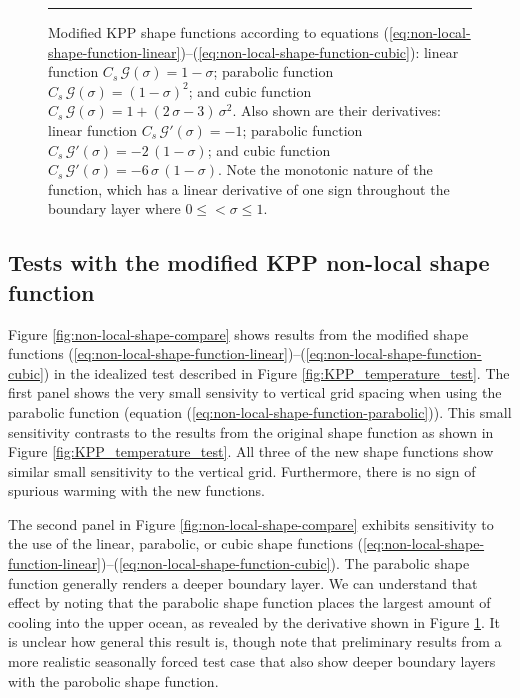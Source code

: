 \begin{figure}[h!t]
\begin{center}
\caption[Modified KPP shape function]{\sf Modified KPP shape functions
  according to equations
  (\ref{eq:non-local-shape-function-linear})--(\ref{eq:non-local-shape-function-cubic}):
  linear function $C_{s} \, \mathcal{G}(\sigma) = 1 - \sigma$;
  parabolic function $C_{s} \, \mathcal{G}(\sigma) = (1 -
  \sigma)^{2}$; and cubic function $C_{s} \, \mathcal{G}(\sigma) = 1 +
  (2 \, \sigma - 3) \, \sigma^{2}$.  Also shown are their derivatives:
  linear function $C_{s} \, \mathcal{G}'(\sigma) = -1$; parabolic
  function $C_{s} \, \mathcal{G}'(\sigma) = -2 \, (1 - \sigma)$; and
  cubic function $C_{s} \, \mathcal{G}'(\sigma) = -6 \, \sigma \, (1-
  \sigma)$.  Note the monotonic nature of the function, which has a
  linear derivative of one sign throughout the boundary layer where $0
  \le< \sigma \le 1$.}
\label{fig:KPPmod-shape-function}
\end{center}
\rule{\textwidth}{0.005in}
\end{figure}


\subsection{Tests with the modified KPP non-local shape function}
\label{subsection:tests-of-kpp-modified-non-local}

Figure \ref{fig:non-local-shape-compare} shows results from the
modified shape functions
(\ref{eq:non-local-shape-function-linear})--(\ref{eq:non-local-shape-function-cubic})
in the idealized test described in Figure
\ref{fig:KPP_temperature_test}.  The first panel shows the very small
sensivity to vertical grid spacing when using the parabolic function
(equation (\ref{eq:non-local-shape-function-parabolic})).  This small
sensitivity contrasts to the results from the original shape function
as shown in Figure \ref{fig:KPP_temperature_test}.  All three of the
new shape functions show similar small sensitivity to the vertical
grid.  Furthermore, there is no sign of spurious warming with the new
functions.

The second panel in Figure \ref{fig:non-local-shape-compare} exhibits
sensitivity to the use of the linear, parabolic, or cubic shape
functions
(\ref{eq:non-local-shape-function-linear})--(\ref{eq:non-local-shape-function-cubic}).
The parabolic shape function generally renders a deeper boundary
layer.  We can understand that effect by noting that the parabolic
shape function places the largest amount of cooling into the upper
ocean, as revealed by the derivative shown in Figure
\ref{fig:KPPmod-shape-function}.  It is unclear how general this
result is, though note that preliminary results from a more realistic
seasonally forced test case that also show deeper boundary layers with
the parobolic shape function.


